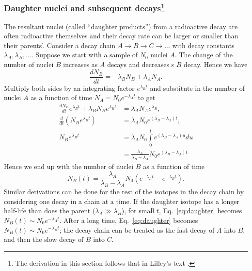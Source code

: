 \documentclass[nofootinbib,preprint,aps]{revtex4-1}
\begin{document}
        \subsubsection{Daughter nuclei and subsequent decays\footnote{The derivation in this section follows that in
        Lilley's text \cite[chapt. 1.5]{l01}.}}
        The resultant nuclei (called ``daughter products'') from a radioactive decay are often radioactive
        themselves and their decay rate can be larger or smaller than their parents'. Consider a decay chain
        $A\rightarrow B \rightarrow C \rightarrow ...$ with decay constants $\lambda_A, \lambda_B,...$. Suppose
        we start with a sample of $N_0$ nuclei $A$. The change of the number of nuclei $B$ increases as $A$
        decays and decreases s $B$ decay. Hence we have
        \begin{equation}
            \frac{dN_B}{dt} = -\lambda_B N_B + \lambda_A N_A.
        \end{equation}
        Multiply both sides by an integrating factor $e^{\lambda_B t}$ and substitute in the number of nuclei
        $A$ as a function of time $N_A=N_0 e^{-\lambda_A t}$ to get
        \begin{align}
            \frac{dN_B}{dt}e^{\lambda_B t} + \lambda_B N_B e^{\lambda_B t} &= \lambda_A N_A e^{\lambda_B},\nonumber\\
            \frac{d}{dt} (N_B e^{\lambda_B t}) &= \lambda_A N_0 e^{(\lambda_B-\lambda_A)t}, \nonumber\\
            N_B e^{\lambda_B t} &= \lambda_A N_0 \int\limits_0^t e^{(\lambda_B - \lambda_A)u} du \nonumber\\
                                &= \frac{\lambda_A}{\lambda_B-\lambda_A}N_0 e^{(\lambda_B - \lambda_A)t}
        \end{align}
        Hence we end up with the number of nuclei $B$ as a function of time
        \begin{equation}
            N_B(t)=\frac{\lambda_A}{\lambda_B-\lambda_A}N_0(e^{-\lambda_A t} - e^{-\lambda_B t}).
            \label{eq:daughter}
        \end{equation}
        Similar derivations can be done for the rest of the isotopes in the decay chain by considering
        one decay in a chain at a time. If the daughter isotope has a longer half-life than does the parent
        ($\lambda_A \gg \lambda_B$), for small $t$, Eq.~\ref{eq:daughter} becomes
        $N_B(t)\sim N_0 e^{-\lambda_A t}$. After a long time,
        Eq.~\ref{eq:daughter} becomes $N_B(t) \sim N_0 e^{-\lambda_B t}$; the decay
        chain can be treated as the fast decay of $A$ into $B$, and then the slow decay of $B$
        into $C$.
        
\end{document}
